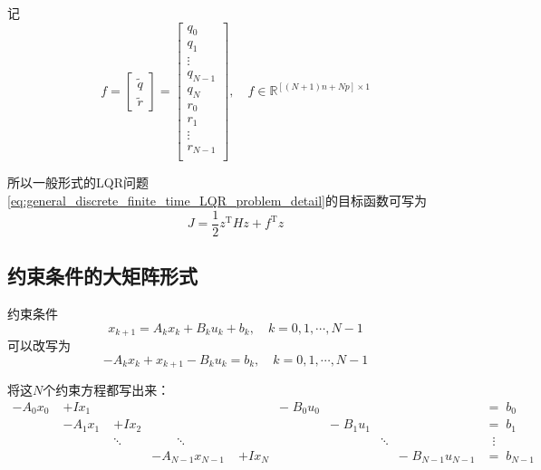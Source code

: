 \documentclass[withoutpreface,bwprint]{NoteBook}
\begin{document}
记
\begin{equation}
\label{eq:block_KKT_f_define}
f = \begin{bmatrix}
\tilde{q} \\ \tilde{r}
\end{bmatrix}

=\begin{bmatrix}
q_0\\
q_1 \\
\vdots \\
q_{N-1} \\
q_{N} \\
r_0\\
r_1 \\
\vdots \\
r_{N-1} \\
\end{bmatrix}
,\quad f \in \mathbb{R}^{[(N+1)n+Np] \times 1}
\end{equation}

所以一般形式的LQR问题\cref{eq:general_discrete_finite_time_LQR_problem_detail}的目标函数可写为
\begin{equation}
\label{eq:block_KKT_J_with_big_matrix}
J = \frac{1}{2} z^\mathrm{T} H z + f^\mathrm{T}z
\end{equation}

\subsection{约束条件的大矩阵形式}

约束条件
$$
x_{k+1} = A_k x_k + B_k u_k + b_k, \quad k=0,1,\cdots,N-1
$$
可以改写为
$$
- A_k x_k + x_{k+1} - B_k u_k = b_k, \quad k=0,1,\cdots,N-1
$$

将这$N$个约束方程都写出来：
\begin{equation}
\label{eq:block_KKT_N_state_space}
\begin{alignedat}{5}
- A_0 x_0 \;&+ I x_1        &            &            &\;&-\; B_0 u_0        &            &            &\;&=\; b_0 \\
            &- A_1 x_1    \;&+ I x_2    &            &\;&                  &-\; B_1 u_1 &            &\;&=\; b_1 \\
            &               &\ddots       &\qquad  \ddots      &\;&                  &      & \ddots       &  &\; \; \vdots  \\
            &               &             &- A_{N-1} x_{N-1} \;&+ I x_N &  &         & &-\; B_{N-1} u_{N-1} &=\; b_{N-1}
\end{alignedat}
\end{equation}
\end{document}
